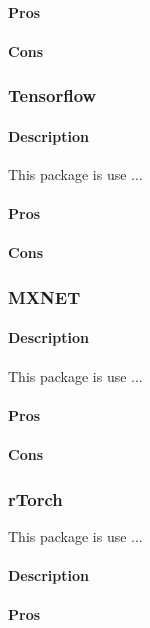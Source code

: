\documentclass[6pt,letter]{article}\usepackage[]{graphicx}\usepackage[]{color}
\begin{document}
\paragraph{Pros}
\paragraph{Cons}

\subsubsection{Tensorflow}
\paragraph{Description}
This package is use ...\cite{tensorflow2019}
\paragraph{Pros}
\paragraph{Cons}


\subsubsection{MXNET}
\paragraph{Description}
This package is use ...\cite{mxnet2020}
\paragraph{Pros}
\paragraph{Cons}

\subsubsection{rTorch}
This package is use ...\cite{rTorch2019}

\paragraph{Description}
\paragraph{Pros}
\end{document}
